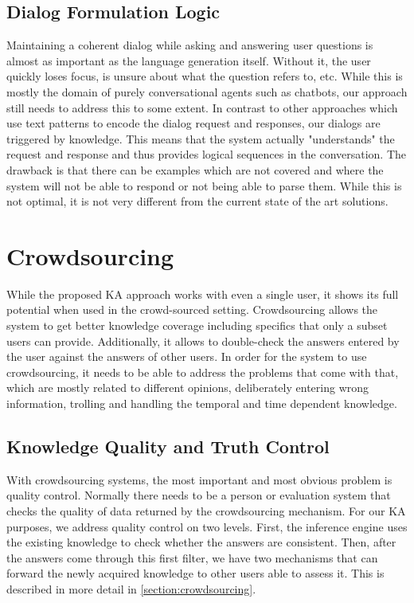 \subsection{Dialog Formulation Logic}
Maintaining a coherent dialog while asking and answering user questions is 
almost as important as the language generation itself. Without it, the user 
quickly loses focus, is unsure about what the question refers to, etc. 
While this is mostly the domain of purely conversational agents such as 
chatbots\parencite{Bradesko2012}, our approach still needs to address this to 
some extent. In contrast to other approaches which use text patterns to encode 
the dialog request and responses, our dialogs are triggered by knowledge. 
This means that the system actually "understands" the request and response and 
thus provides logical sequences in the conversation. The drawback is that there
can be examples which are not covered and where the system will not be able to
respond or not being able to parse them. While this is not optimal, it is not 
very different from the current state of the art solutions.

\section{Crowdsourcing}
\label{section:bg:crowdsourcing}
While the proposed KA approach works with even a single user, it shows its 
full potential when used in the crowd-sourced setting. Crowdsourcing allows 
the system to get better knowledge coverage including specifics that only a 
subset users can provide. Additionally, it allows to double-check the answers 
entered by the user against the answers of other users. In order for the system 
to use crowdsourcing, it needs to be able to address the problems that come 
with that, which are mostly related to different opinions, deliberately entering 
wrong information, trolling and handling the temporal and time dependent 
knowledge.

\subsection{Knowledge Quality and Truth Control} 
With crowdsourcing systems, the most important and most obvious problem is 
quality control. Normally there needs to be a person or evaluation system that 
checks the quality of data returned by the crowdsourcing mechanism. For our 
KA purposes, we address quality control on two levels. First, the inference 
engine uses the existing knowledge to check whether the answers are consistent. 
Then, after the answers come through this first filter, we have two mechanisms 
that can forward the newly acquired knowledge to other users able to assess it. 
This is described in more detail in \autoref{section:crowdsourcing}.

